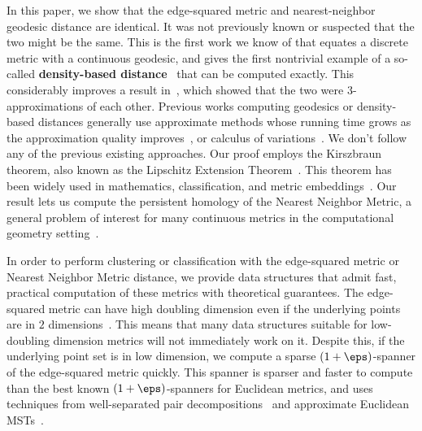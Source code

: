 
In this paper, we show that the edge-squared metric and nearest-neighbor
geodesic distance are
identical. It was not previously known or
suspected that the two might be the same. This is the
first work we know of that equates a discrete metric with a
continuous geodesic, and gives the first nontrivial example of a
so-called \textbf{density-based distance}~\cite{sajama05estimatingDBDM} that can
be computed exactly. This considerably improves a result
in~\cite{cohen15approximating}, which showed that the two were
$3$-approximations of each other. Previous works computing
geodesics or density-based distances generally use approximate
methods whose running time grows as the approximation
quality improves~\cite{Kimmel98, tenenbaum00global,
alamgir12shortest, agarwal16efficient, hwang2016,
cohen15approximating}, or
calculus of variations~\cite{bernoulli, Schwarzschild, Sussmann97}.
We don't follow any of the previous existing approaches. Our proof employs
the Kirszbraun theorem, also known as the Lipschitz
Extension Theorem~\cite{Kirszbraun1934, brehm1981}. This theorem has been
widely used in mathematics, classification, and metric
embeddings~\cite{Naor06, Lee05, Naor15, Gottlieb14, Gottlieb17}.
Our result lets us compute the persistent
homology of the Nearest Neighbor Metric, a general problem of interest for
many continuous metrics in the computational geometry
setting~\cite{edelsbrunner02topological,gasparovic17complete,chazal08towards,chazal13persistence,carlsson09topology}.

In order to perform clustering or classification with the edge-squared
metric or Nearest Neighbor Metric distance, we
provide data structures that admit fast, practical
computation of these metrics with theoretical guarantees. The
edge-squared metric can have high doubling
dimension even if the underlying points are in $2$
dimensions~\cite{cohen15approximating}. This
means that many data structures suitable for low-doubling dimension
metrics will not immediately
work on it. Despite this, if the underlying point set is in low dimension,
we compute a sparse $(1+\eps)$-spanner of
the edge-squared metric quickly.
This spanner is sparser and faster to compute than the
best known $(1+\eps)$-spanners for Euclidean metrics, and uses
techniques from well-separated pair
decompositions~\cite{Callahan1993} and
approximate Euclidean MSTs~\cite{arya95euclid, Arya2016,
Callahan1995}.


